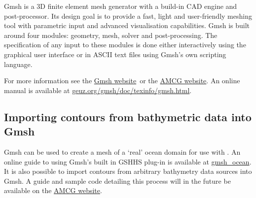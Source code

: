 Gmsh is a 3D finite element mesh generator with a build-in CAD engine and post-processor.
Its design goal is to provide a fast, light and user-friendly meshing tool with parametric
input and advanced visualisation capabilities. Gmsh is built around four modules: geometry,
mesh, solver and post-processing. The specification of any input to these modules is done
either interactively using the graphical user interface or in ASCII text files using Gmsh's
own scripting language.

For more information see the \href{http://geuz.org/gmsh/}{Gmsh website}\ or the \href{http://amcg.ese.ic.ac.uk}{AMCG
website}. An online manual is available at \href{http://geuz.org/gmsh/doc/texinfo/gmsh.html}{geuz.org/gmsh/doc/texinfo/gmsh.html}.

\subsection{Importing contours from bathymetric data into Gmsh}

Gmsh can be used to create a mesh of a `real' ocean domain for use with \fluidity. An online guide to using Gmsh's built in
GSHHS plug-in is available at \href{http://perso.uclouvain.be/jonathan.lambrechts/gmsh_ocean/}{gmsh\_ocean}.
It is also possible to import contours from arbitrary bathymetry data sources into Gmsh. A guide and sample code detailing this process will
in the future be available on the \href{http://amcg.ese.ic.ac.uk}{AMCG website}.
